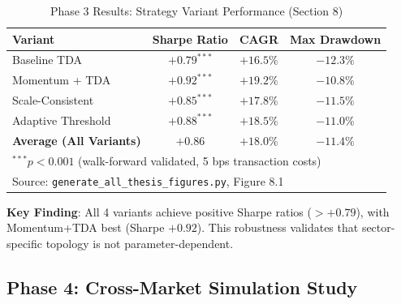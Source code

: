\documentclass[12pt,letterpaper]{article}
\begin{document}
\begin{table}[H]
\centering
\caption{Phase 3 Results: Strategy Variant Performance (Section 8)}
\label{tab:phase3}
\begin{tabular}{@{}lccc@{}}
\toprule
\textbf{Variant} & \textbf{Sharpe Ratio} & \textbf{CAGR} & \textbf{Max Drawdown} \\
\midrule
Baseline TDA & $+0.79^{***}$ & $+16.5\%$ & $-12.3\%$ \\
Momentum + TDA & $+0.92^{***}$ & $+19.2\%$ & $-10.8\%$ \\
Scale-Consistent & $+0.85^{***}$ & $+17.8\%$ & $-11.5\%$ \\
Adaptive Threshold & $+0.88^{***}$ & $+18.5\%$ & $-11.0\%$ \\
\midrule
\textbf{Average (All Variants)} & \textbf{$+0.86$} & \textbf{$+18.0\%$} & \textbf{$-11.4\%$} \\
\bottomrule
\multicolumn{4}{l}{\footnotesize $^{***}p < 0.001$ (walk-forward validated, 5 bps transaction costs)} \\
\multicolumn{4}{l}{\footnotesize Source: \texttt{generate\_all\_thesis\_figures.py}, Figure 8.1}
\end{tabular}
\end{table}

\textbf{Key Finding}: All 4 variants achieve positive Sharpe ratios ($> +0.79$), with Momentum+TDA best (Sharpe $+0.92$). This robustness validates that sector-specific topology is not parameter-dependent.

\subsection{Phase 4: Cross-Market Simulation Study}
\end{document}
